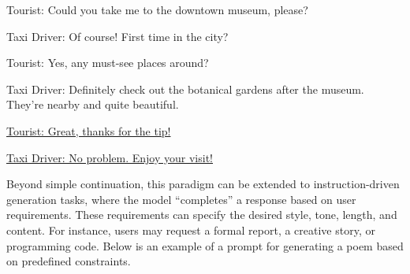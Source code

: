 \vspace{0.5em}
\begin{tcolorbox}

\begingroup
\setlength{\leftskip}{2em}
\setlength{\rightskip}{2em}


\vspace{0.7em}

Tourist: Could you take me to the downtown museum, please?

\vspace{0.3em}

Taxi Driver: Of course! First time in the city?

\vspace{0.3em}

Tourist: Yes, any must-see places around?

\vspace{0.3em}

Taxi Driver: Definitely check out the botanical gardens after the museum. They're nearby and quite beautiful.

\vspace{0.3em}

\uline{Tourist: Great, thanks for the tip!}

\vspace{0.3em}

\uline{Taxi Driver: No problem. Enjoy your visit!}

\endgroup

\end{tcolorbox}
\vspace{0.5em}

Beyond simple continuation, this paradigm can be extended to instruction-driven generation tasks, where the model ``completes'' a response based on user requirements. These requirements can specify the desired style, tone, length, and content. For instance, users may request a formal report, a creative story, or programming code. Below is an example of a prompt for generating a poem based on predefined constraints.

